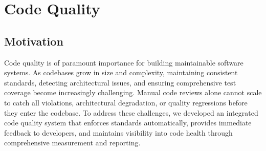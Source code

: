 \section{Code Quality}


\subsection{Motivation}
Code quality is of paramount importance for building maintainable software
systems. As codebases grow in size and complexity, maintaining consistent
standards, detecting architectural issues, and ensuring comprehensive test
coverage become increasingly challenging. Manual code reviews alone cannot
scale to catch all violations, architectural degradation, or quality
regressions before they enter the codebase. To address these challenges, we
developed an integrated code quality system that enforces standards
automatically, provides immediate feedback to developers, and maintains
visibility into code health through comprehensive measurement and reporting.

